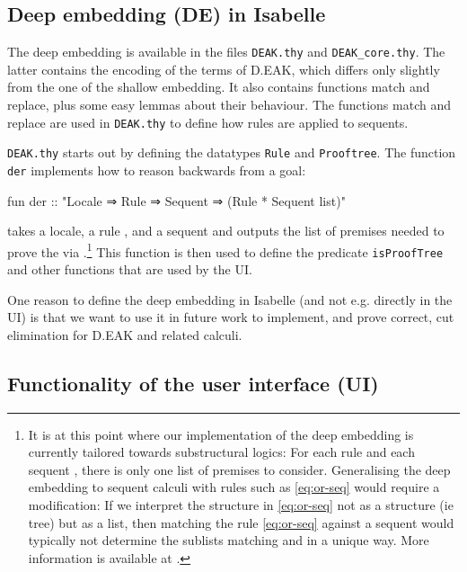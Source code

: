 \documentclass[runningheads,a4paper]{llncs}
\begin{document}
\subsection{Deep embedding (DE) in Isabelle}

The deep embedding is available in the files \texttt{DEAK.thy} and \texttt{DEAK\_core.thy}. The latter contains the encoding of the terms of D.EAK, which differs only slightly from the one of the shallow embedding. It also contains functions match and replace, plus some easy lemmas about their behaviour. The functions match and replace are used  in \texttt{DEAK.thy} to define how rules are applied to sequents.

\texttt{DEAK.thy} starts out by defining the datatypes \texttt{Rule} and \texttt{Prooftree}. The function \texttt{der} implements how to reason backwards from a goal:
\begin{pyglist}[language=isabelle]
fun der :: "Locale ⇒ Rule ⇒ Sequent ⇒ (Rule * Sequent list)"
\end{pyglist}
\noindent takes a locale, a rule , and a sequent  and outputs the list of premises needed to prove the  via .\footnote{It is at this point where our implementation of the deep embedding is currently tailored towards substructural logics: For each rule  and each sequent , there is only one list of premises to consider. Generalising the deep embedding to sequent calculi with rules such as \eqref{eq:or-seq} would require a modification: If we interpret the structure  in \eqref{eq:or-seq} not as a structure (ie tree) but as a list, then matching the rule \eqref{eq:or-seq} against a sequent would typically not determine the sublists matching  and  in a unique way. More information is available at \cite{Balco:tutorial}.} 
This function is then used to define the predicate \texttt{isProofTree} and other functions that are used by the UI.

One reason to define the deep embedding in Isabelle (and not e.g. directly in the UI) is that we want to use it in future work to implement, and prove correct, cut elimination for D.EAK and related calculi.

\subsection{Functionality of the user interface (UI)}
\end{document}
